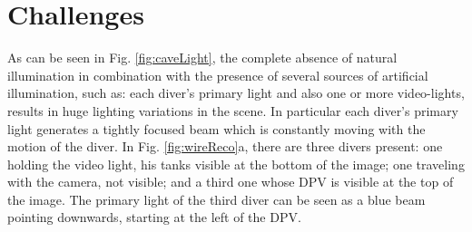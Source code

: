 \section{Challenges}\label{sec:pcchallenges}



As can be seen in Fig. \ref{fig:caveLight}, the complete absence of natural illumination in combination with the presence of several sources of artificial illumination, such as: each diver's primary light and also one or more video\hyp lights, results in huge lighting variations in the scene. In particular each diver's primary light generates a tightly focused beam which is constantly moving with the motion of the diver. In Fig. \ref{fig:wireReco}a, there are three divers present: one holding the video light, his tanks visible at the bottom of the image; one traveling with the camera, not visible; and a third one whose DPV is visible at the top of the image. The primary light of the third diver can be seen as a blue beam pointing downwards, starting at the left of the DPV. 

